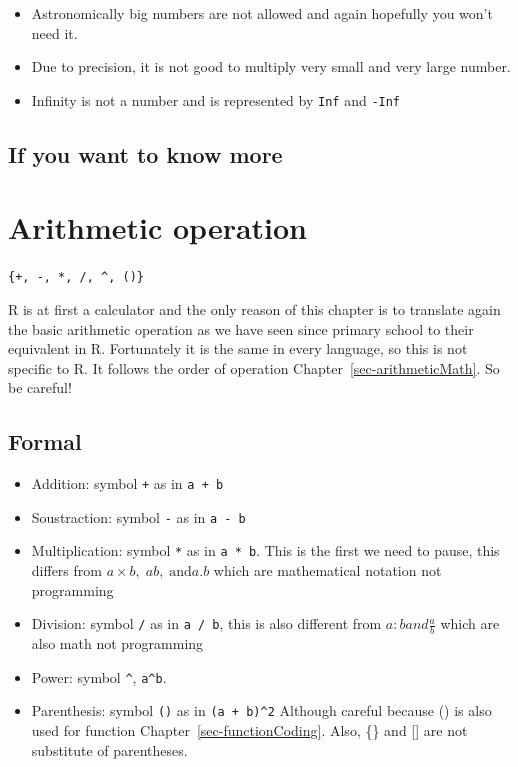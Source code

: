 \documentclass[
  letterpaper,
  DIV=11,
  numbers=noendperiod]{scrreprt}
\providecommand{\tightlist}{%
  \setlength{\itemsep}{0pt}\setlength{\parskip}{0pt}}
\begin{document}
\begin{itemize}
\tightlist
\item
  Astronomically big numbers are not allowed and again hopefully you
  won't need it.
\item
  Due to precision, it is not good to multiply very small and very large
  number.
\item
  Infinity is not a number and is represented by \texttt{Inf} and
  \texttt{-Inf}
\end{itemize}

\section*{If you want to know more}\label{if-you-want-to-know-more-1}


\chapter{Arithmetic operation}\label{sec-arithmeticCoding}

\texttt{\{+,\ -,\ *,\ /,\ \^{},\ ()\}}

R is at first a calculator and the only reason of this chapter is to
translate again the basic arithmetic operation as we have seen since
primary school to their equivalent in R. Fortunately it is the same in
every language, so this is not specific to R. It follows the order of
operation Chapter~\ref{sec-arithmeticMath}. So be careful!

\section*{Formal}\label{formal-30}


\begin{itemize}
\tightlist
\item
  Addition: symbol \texttt{+} as in \texttt{a\ +\ b}
\item
  Soustraction: symbol \texttt{-} as in \texttt{a\ -\ b}
\item
  Multiplication: symbol \texttt{*} as in \texttt{a\ *\ b}. This is the
  first we need to pause, this differs from
  \(a \times b, \; a b, \; \text{and} a.b\) which are mathematical
  notation not programming
\item
  Division: symbol \texttt{/} as in \texttt{a\ /\ b}, this is also
  different from \(a:b and \frac{a}{b}\) which are also math not
  programming
\item
  Power: symbol \texttt{\^{}}, \texttt{a\^{}b}.
\item
  Parenthesis: symbol \texttt{()} as in \texttt{(a\ +\ b)\^{}2} Although
  careful because () is also used for function
  Chapter~\ref{sec-functionCoding}. Also, \{\} and {[}{]} are not
  substitute of parentheses.
\end{itemize}
\end{document}
